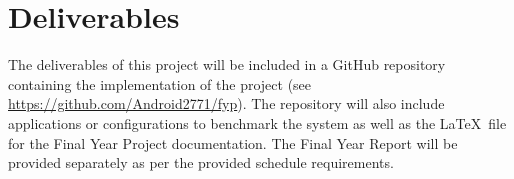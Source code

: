 \documentclass[12pt]{article}
\begin{document}
\section{Deliverables}
The deliverables of this project will be included in a GitHub repository containing the implementation of the project (see \url{https://github.com/Android2771/fyp}). The repository will also include applications or configurations to benchmark the system as well as the \LaTeX~file for the Final Year Project documentation. The Final Year Report will be provided separately as per the provided schedule requirements.

  
\end{document}
